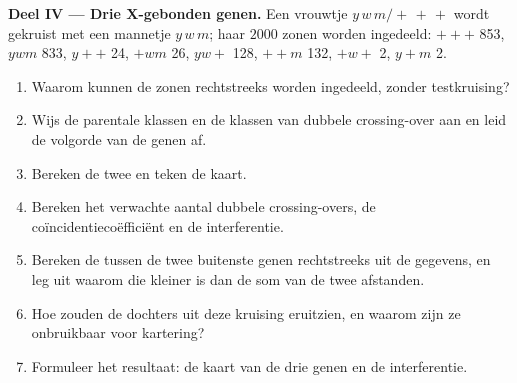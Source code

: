 \begin{problem}
\medskip
\noindent\textbf{Deel IV --- Drie X-gebonden genen.}
Een vrouwtje $y\,w\,m/+\,+\,+$ wordt gekruist met een mannetje $y\,w\,m$;
haar $2000$ zonen worden ingedeeld: $+++$ 853, $ywm$ 833, $y++$ 24, $+wm$ 26, $yw+$ 128,
$++m$ 132, $+w+$ 2, $y+m$ 2.
\begin{enumerate}[resume]
  \item Waarom kunnen de zonen rechtstreeks worden ingedeeld, zonder
        testkruising?
  \item Wijs de parentale klassen en de klassen van dubbele crossing-over
        aan en leid de volgorde van de genen af.
  \item Bereken de twee  en teken de kaart.
  \item Bereken het verwachte aantal dubbele crossing-overs, de
        coïncidentiecoëfficiënt en de interferentie.
  \item Bereken de  tussen de twee buitenste
        genen rechtstreeks uit de gegevens, en leg uit waarom die kleiner
        is dan de som van de twee afstanden.
  \item Hoe zouden de dochters uit deze kruising eruitzien, en waarom zijn
        ze onbruikbaar voor kartering?
  \item Formuleer het resultaat: de kaart van de drie genen en de
        interferentie.
\end{enumerate}
\end{problem}
